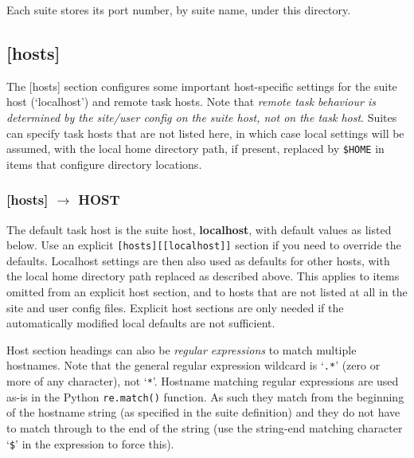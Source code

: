 Each suite stores its port number, by suite name, under this directory.


\subsection{[hosts]}

The [hosts] section configures some important host-specific settings for
the suite host (`localhost') and remote task hosts. Note that {\em
remote task behaviour is determined by the site/user config on the
suite host, not on the task host}. Suites can specify task hosts that 
are not listed here, in which case local settings will be assumed,
with the local home directory path, if present, replaced by
\lstinline=$HOME= in items that configure directory locations.

\subsubsection[{[[}HOST{]]}]{[hosts] $\rightarrow$ HOST}

The default task host is the suite host, {\bf localhost}, with default 
values as listed below. Use an explicit \lstinline=[hosts][[localhost]]=
section if you need to override the defaults. Localhost settings are
then also used as defaults for other hosts, with the local home
directory path replaced as described above. This applies to items
omitted from an explicit host section, and to hosts that are not listed
at all in the site and user config files.  Explicit host sections are only
needed if the automatically modified local defaults are not sufficient.

Host section headings can also be {\em regular expressions} to match 
multiple hostnames.  Note that the general regular expression wildcard
is `\lstinline=.*=' (zero or more of any character), not 
`\lstinline=*='.
Hostname matching regular expressions are used as-is in the Python
\lstinline=re.match()= function. As such they match from the beginning 
of the hostname string (as specified in the suite definition) and they
do not have to match through to the end of the string (use the
string-end matching character `\lstinline=$=' in the expression to 
force this).

